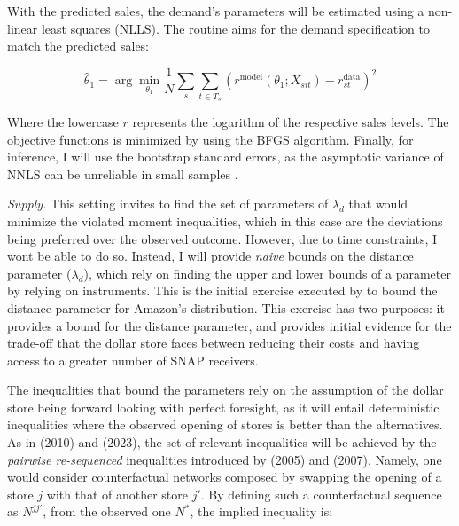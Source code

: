 \documentclass[11.5pt]{article}
\begin{document}
With the predicted sales, the demand's parameters will be estimated using a non-linear least squares (NLLS). The routine aims for the demand specification to match the predicted sales:

\[\hat \theta_\text{1} = \arg \min_{\theta_1} \frac{1}{N} \sum_{s} \sum_{t \in T_s} \left( r^\text{model}(\theta_1;X_{sit})  - r^\text{data}_{st}\right)^2 \]

 Where the lowercase $r$ represents the logarithm of the respective sales levels. The objective functions is minimized by using the BFGS algorithm. Finally, for inference, I will use the bootstrap standard errors, as the asymptotic variance of NNLS can be unreliable in small samples \cite{hansen2022econometrics}.



\textit{Supply.} This setting invites to find the set of parameters of $\lambda_d$ that would minimize the violated moment inequalities, which in this case are the deviations being preferred over the observed outcome. However, due to time constraints, I wont be able to do so. Instead, I will provide \textit{naive} bounds on the distance parameter ($\lambda_d$), which rely on finding the upper and lower bounds of a parameter by relying on instruments. This is the initial exercise executed by \citeauthor{houde2023nexus} \citeyear{houde2023nexus} to bound the distance parameter for Amazon's distribution. This exercise has two purposes: it provides a bound for the distance parameter, and provides initial evidence for the trade-off that the dollar store faces between reducing their costs and having access to a greater number of SNAP receivers. 


The inequalities that bound the parameters rely on the assumption of the dollar store being forward looking with perfect foresight, as it will entail deterministic inequalities where the observed opening of stores is better than the alternatives.  As in \citeauthor{holmes2011diffusion} (2010) and \citeauthor{houde2023nexus} (2023), the set of relevant inequalities will be achieved by the \textit{pairwise re-sequenced} inequalities introduced by  \citeauthor{bajari2005measuring} (2005) and \citeauthor{fox2007semiparametric} (2007). Namely, one would consider counterfactual networks composed by swapping the opening of a store $j$ with that of another store $j'$. By defining such a counterfactual sequence as $N^{jj'}$, from the observed one $N^*$, the implied inequality is:
\end{document}
